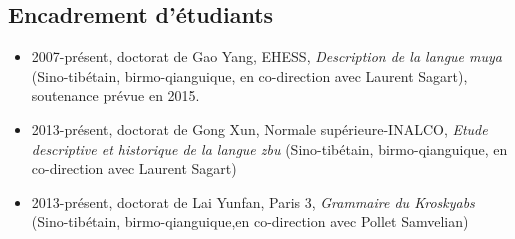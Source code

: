 \documentclass[oldfontcommands,oneside,a4paper,11pt]{article}
\begin{document}
\subsection*{Encadrement d'étudiants}
\begin{itemize}
\item 2007-présent, doctorat de Gao Yang, EHESS, \textit{Description de la langue muya} (Sino-tibétain, birmo-qianguique, en co-direction avec Laurent Sagart), soutenance prévue en 2015.
\item 2013-présent, doctorat de Gong Xun, Normale supérieure-INALCO, \textit{Etude descriptive et historique de la langue zbu} (Sino-tibétain, birmo-qianguique, en co-direction avec Laurent Sagart)
\item 2013-présent, doctorat de Lai Yunfan, Paris 3, \textit{Grammaire du Kroskyabs} (Sino-tibétain, birmo-qianguique,en co-direction avec Pollet Samvelian)
\end{itemize}
\end{document}
